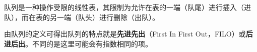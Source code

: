 {队列是一种操作受限的线性表，其限制为{允许在表的一端（队尾）进行插入（进队），而在表的另一端（队头）进行删除（出队）。}}

{由队列的定义可得出队列的特点就是\textbf{{先进先出}}（First In First
Out，FILO）或{\textbf{后进后出}}。不同的是这里可能会有指数相同的项。}
